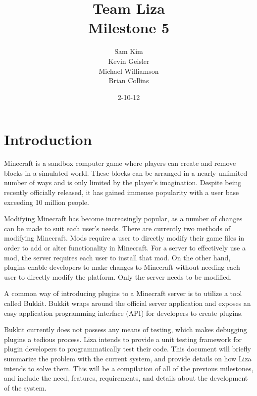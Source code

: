 \documentclass{article}
\title{Team Liza \\ Milestone 5}
\author{Sam Kim \\ Kevin Geisler \\ Michael Williamson \\ Brian Collins}
\date{2-10-12}
\begin{document}
\maketitle
\newpage

\tableofcontents

\newpage

\section{Introduction}

\noindent   

Minecraft is a sandbox computer game where players can create and remove blocks in a simulated world. 
These blocks can be arranged in a nearly unlimited number of ways and is only limited by the player's imagination.
 Despite being recently officially released, it has gained immense popularity with a user base exceeding 10 million people. \newline

\noindent Modifying Minecraft has become increasingly popular, as a number of changes can be made to suit each user’s needs.
 There are currently two methods of modifying Minecraft. Mods require a user to directly modify their game files in order to add 
or alter functionality in Minecraft. For a server to effectively use a mod, the server requires each user to install that mod. On the 
other hand, plugins enable developers to make changes to Minecraft without needing each user to directly modify the platform. 
Only the server needs to be modified. \newline 

\noindent A common way of introducing plugins to a Minecraft server is to utilize a tool called Bukkit. Bukkit wraps around the official
 server application and exposes an easy application programming interface (API) for developers to create plugins.  \newline

\noindent Bukkit currently does not possess any means of testing, which makes debugging plugins a tedious process. Liza intends to 
provide a unit testing framework for plugin developers to programmatically test their code.  This document will briefly summarize the 
problem with the current system, and provide details on how Liza intends to solve them. This will be a compilation of all of the previous
 milestones, and include the need, features, requirements, and details about the development of the system.

\newpage
\end{document}
